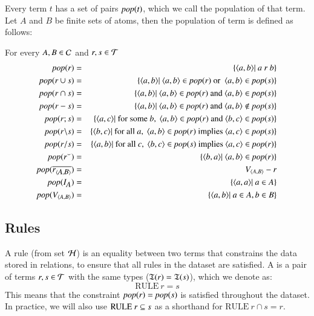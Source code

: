\documentclass{elsarticle}
\begin{document}
	Every term $t$ has a set of pairs $\text{\it pop\/}(t)$, which we call the population of that term.
 	Let $A$ and $B$ be finite sets of atoms, then the population of term is defined as follows:
\begin{definition}
\label{population of terms}
\item   For every $A,B\in\mathcal{C}$ and $r,s\in\mathcal{T}$
\begin{eqnarray*}
	\text{\it pop\/}(r)		 &=&\{\langle{a},{b}\rangle|\ a\ r\ b\}	\\
	\text{\it pop\/}(r \cup s)	 &=&\{\langle{a},{b}\rangle|\ \langle{a},{b}\rangle\in\text{\it pop\/}(r)\ \text{or }\ \langle{a},{b}\rangle\in\text{\it pop\/}(s)\}	\\
	\text{\it pop\/}(r \cap s)	 &=&\{\langle{a},{b}\rangle|\ \langle{a},{b}\rangle\in\text{\it pop\/}(r)\ \text{and}\ \langle{a},{b}\rangle\in\text{\it pop\/}(s)\}	\\
	\text{\it pop\/}(r-s)	 &=&\{\langle{a},{b}\rangle|\ \langle{a},{b}\rangle\in\text{\it pop\/}(r)\ \text{and}\ \langle{a},{b}\rangle\notin\text{\it pop\/}(s)\}	\\
	\text{\it pop\/}(r;s)	 &=&\{\langle{a},{c}\rangle|\ \text{for some}\ b,\ \langle{a},{b}\rangle\in\text{\it pop\/}(r)\ \text{and}\ \langle{b},{c}\rangle\in\text{\it pop\/}(s)\}	\\
	\text{\it pop\/}(r\backslash s)	 &=&\{\langle{b},{c}\rangle|\ \text{for all}\ a,\ \langle{a},{b}\rangle\in\text{\it pop\/}(r)\ \text{implies}\ \langle{a},{c}\rangle\in\text{\it pop\/}(s)\}	\\
	\text{\it pop\/}(r\slash s)	 &=&\{\langle{a},{b}\rangle|\ \text{for all}\ c,\ \langle{b},{c}\rangle\in\text{\it pop\/}(s)\ \text{implies}\ \langle{a},{c}\rangle\in\text{\it pop\/}(r)\}	\\
	\text{\it pop\/}({r}^\smallsmile)	 &=&\{\langle{b},{a}\rangle|\ \langle{a},{b}\rangle\in\text{\it pop\/}(r)    \}	\\
	\text{\it pop\/}(\overline{\text{\it r\/}_{\langle{\text{\it \small A\/}},{\text{\it \small B\/}}\rangle}})	 &=&V_{\langle{A},{B}\rangle}-r	\\
	\text{\it pop\/}(I_{\text{\it \small A\/}}) 	 &=&\{\langle{a},{a}\rangle|\ a\in A\}	\\
	\text{\it pop\/}(V_{\langle{A},{B}\rangle})&=&\{\langle{a},{b}\rangle|\ a\in A, b\in B\}
\end{eqnarray*}
\end{definition}

\subsection{Rules}
	A rule (from set $\mathcal{H}$) is an equality between two terms that constrains the data stored in relations,
	to ensure that all rules in the dataset are satisfied.
	A  is a pair of terms $r,s\in\mathcal{T}$ with the same types ($\mathfrak{T}(r)=\mathfrak{T}(s)$), which we denote as:
\[\text{RULE}\ r = s\]
	This means that the constraint \(\text{\it pop\/}(r) = \text{\it pop\/}(s)\) is satisfied throughout the dataset.
	In practice, we will also use \(\text{RULE}\ r\subseteq s\) as a shorthand for \(\text{RULE}\ r\cap s = r\).
\end{document}
